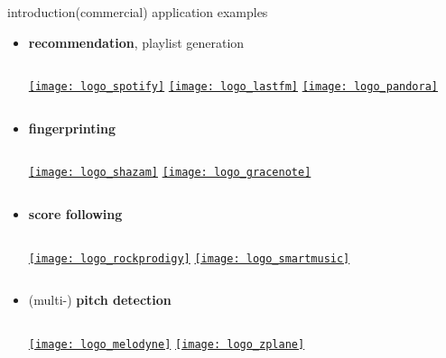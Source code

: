         \begin{frame}{introduction}{(commercial) application examples}
            \begin{itemize}
                \item   \textbf{recommendation}, playlist generation
                    \begin{columns}
                            \href{https://www.spotify.com}{\texttt{[image: logo\_spotify]}}
                            \href{https://www.last.fm}{\texttt{[image: logo\_lastfm]}}
                            \href{https://www.pandora.com}{\texttt{[image: logo\_pandora]}}
                    \end{columns}
                \bigskip
                \item<1->   \textbf{fingerprinting} 
                    \begin{columns}
                            \href{https://www.shazam.com}{\texttt{[image: logo\_shazam]}}
                            \href{https://www.gracenote.com}{\texttt{[image: logo\_gracenote]}}
                    \end{columns}
                \bigskip
                \item<1->   \textbf{score following} 
                   \begin{columns}
                            \href{http://www.rockprodigy.com}{\texttt{[image: logo\_rockprodigy]}}
                            \href{https://www.smartmusic.com}{\texttt{[image: logo\_smartmusic]}}
                    \end{columns}
                \bigskip
                \item<1->   (multi-) \textbf{pitch detection} 
                    \begin{columns}
                            \href{http://www.celemony.com}{\texttt{[image: logo\_melodyne]}}
                            \href{http://www.zplane.de}{\texttt{[image: logo\_zplane]}}
                    \end{columns}
            \end{itemize}
        \end{frame}

